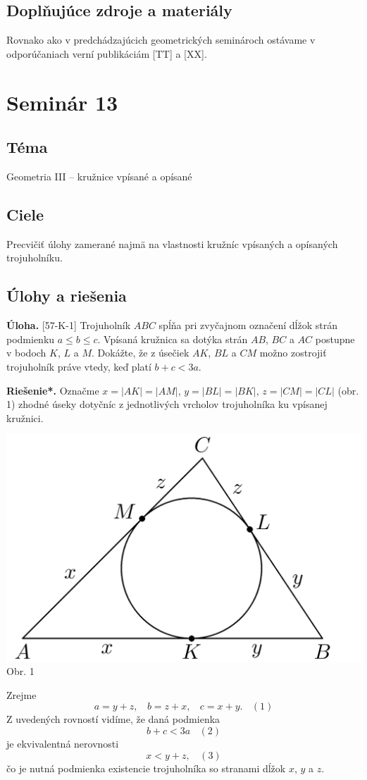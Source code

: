 \documentclass[11pt,a4paper,oneside,final]{book}
\newcommand{\ul}{\textbf{Úloha.} }
\newcommand{\rieh}{\textbf{Riešenie*.} }
\begin{document}
\subsection*{Doplňujúce zdroje a materiály}
Rovnako ako v predchádzajúcich geometrických seminároch ostávame v odporúčaniach verní publikáciám [TT] a [XX].
\newpage

\section*{Seminár 13}
\subsection*{Téma}
Geometria III -- kružnice vpísané a opísané

\subsection*{Ciele}
Precvičiť úlohy zamerané najmä na vlastnosti kružníc vpísaných a opísaných trojuholníku.

\subsection*{Úlohy a riešenia}
\begin{tcolorbox}[breakable,notitle,boxrule=0pt,colback=light-gray,colframe=light-gray]\ul [57-K-1] Trojuholník $ABC$ spĺňa pri zvyčajnom označení dĺžok strán podmienku $a \leq b \leq c$. Vpísaná kružnica sa dotýka strán $AB$, $BC$ a $AC$ postupne v bodoch $K$, $L$ a $M$. Dokážte, že z úsečiek $AK$, $BL$ a $CM$ možno zostrojiť trojuholník práve vtedy, keď platí $b + c < 3a$.

\end{tcolorbox}

\rieh Označme $x = |AK| = |AM|$, $y = |BL| = |BK|$, $z = |CM| = |CL|$ (obr. 1) zhodné úseky dotyčníc z jednotlivých vrcholov trojuholníka ku vpísanej kružnici.
\begin{center}
\includegraphics{57K1}\\

Obr. 1
\end{center}
Zrejme
$$a= y + z, \ \ \ \ b = z + x, \ \ \ \ c = x + y. \ \ \ \ (1)$$
Z uvedených rovností vidíme, že daná podmienka
$$b + c < 3a \ \ \ \ (2)$$
je ekvivalentná nerovnosti
$$x < y + z, \ \ \ \ (3)$$
čo je nutná podmienka existencie trojuholníka so stranami dĺžok $x$, $y$ a $z$.
\end{document}
